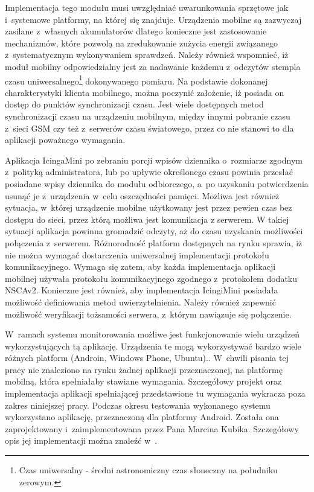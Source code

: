 Implementacja tego modułu musi uwzględniać uwarunkowania sprzętowe jak
i~systemowe platformy, na której się znajduje. Urządzenia mobilne są
zazwyczaj zasilane z~własnych akumulatorów dlatego konieczne jest
zastosowanie mechanizmów, które pozwolą na zredukowanie zużycia
energii związanego z~systematycznym wykonywaniem sprawdzeń. Należy
również wspomnieć, iż moduł mobilny odpowiedzialny jest za nadawanie
każdemu z~odczytów stempla czasu uniwersalnego\footnote{Czas
  uniwersalny - średni astronomiczny czas słoneczny na południku
  zerowym.} dokonywanego pomiaru. Na podstawie dokonanej
charakterystyki klienta mobilnego, można poczynić założenie, iż
posiada on dostęp do punktów synchronizacji czasu. Jest wiele
dostępnych metod synchronizacji czasu na urządzeniu mobilnym, między
innymi pobranie czasu z~sieci GSM czy też z~serwerów czasu światowego,
przez co nie stanowi to dla aplikacji poważnego wymagania.

Aplikacja IcingaMini po zebraniu porcji wpisów dziennika o~rozmiarze
zgodnym z~polityką administratora, lub po upływie określonego czasu
powinia przesłać posiadane wpisy dziennika do modułu odbiorczego, a~po
uzyskaniu potwierdzenia usunąć je z~urządzenia w~celu oszczędności
pamięci. Możliwa jest również sytuacja, w~której urządzenie mobilne
użytkowany jest przez pewien czas bez dostępu do sieci, przez którą
możliwa jest komunikacja z serwerem. W takiej sytuacji aplikacja
powinna gromadzić odczyty, aż do czasu uzyskania możliwości połączenia
z~serwerem. Różnorodność platform dostępnych na rynku sprawia, iż nie
można wymagać dostarczenia uniwersalnej implementacji protokołu
komunikacyjnego. Wymaga się zatem, aby każda implementacja aplikacji
mobilnej używała protokołu komunikacyjnego zgodnego z~protokołem
dodatku NSCAv2. Konieczne jest również, aby implementacja IcingiMini
posiadała możliwość definiowania metod uwierzytelnienia. Należy
również zapewnić możliwość weryfikacji tożsamości serwera, z~którym
nawiązuje się połączenie.

W~ramach systemu monitorowania możliwe jest funkcjonowanie wielu
urządzeń wykorzystujących tą aplikację. Urządzenia te mogą
wykorzystywać bardzo wiele różnych platform (Androin, Windows Phone,
Ubuntu).. W~chwili pisania tej pracy nie znaleziono na rynku żadnej
aplikacji przeznaczonej, na platformę mobilną, która spełniałaby
stawiane wymagania. Szczegółowy projekt oraz implementacja aplikacji
spełniającej przedstawione tu wymagania wykracza poza zakres
niniejszej pracy. Podczas okresu testowania wykonanego systemu
wykorzystano aplikację, przeznaczoną dla platformy Android. Została
ona zaprojektowany i~zaimplementowana przez Pana Marcina
Kubika. Szczegółowy opis jej implementacji można znaleźć
w~\cite{book:pracaKubika}.

